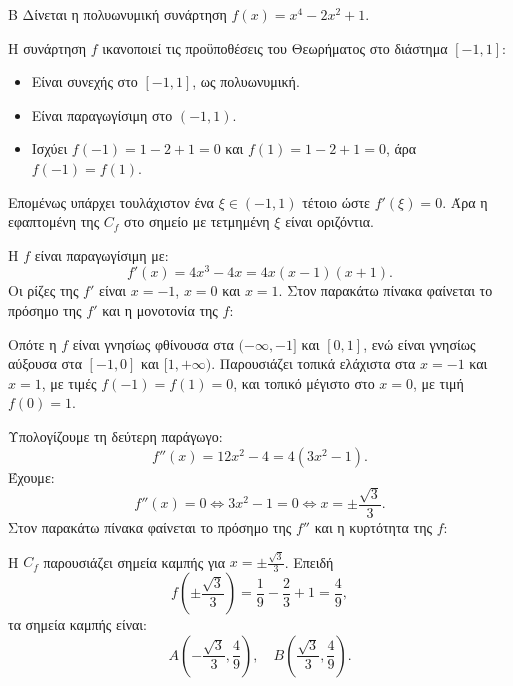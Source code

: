 \begin{thema}{Β}
Δίνεται η πολυωνυμική συνάρτηση $f(x) = x^4 - 2x^2 + 1$.
\begin{erwthma}
\item Η συνάρτηση $f$ ικανοποιεί τις προϋποθέσεις του Θεωρήματος  στο διάστημα $[-1,1]$:
\begin{itemize}
\item Είναι συνεχής στο $[-1,1]$, ως πολυωνυμική.
\item Είναι παραγωγίσιμη στο $(-1,1)$.
\item Ισχύει $f(-1)=1-2+1=0$ και $f(1)=1-2+1=0$, άρα $f(-1)=f(1)$.
\end{itemize}
Επομένως υπάρχει τουλάχιστον ένα $\xi\in(-1,1)$ τέτοιο ώστε $f'(\xi)=0$. Άρα η εφαπτομένη της $C_f$ στο σημείο με τετμημένη $\xi$ είναι οριζόντια.

\item Η $f$ είναι παραγωγίσιμη με:
\[ f'(x)=4x^3-4x=4x(x-1)(x+1). \]
Οι ρίζες της $f'$ είναι $x=-1$, $x=0$ και $x=1$.
Στον παρακάτω πίνακα φαίνεται το πρόσημο της $f'$ και η μονοτονία της $f$:
\begin{center}
\end{center}
Οπότε η $f$ είναι γνησίως φθίνουσα στα $(-\infty,-1]$ και $[0,1]$, ενώ είναι γνησίως αύξουσα στα $[-1,0]$ και $[1,+\infty)$.
Παρουσιάζει τοπικά ελάχιστα στα $x=-1$ και $x=1$, με τιμές $f(-1)=f(1)=0$, και τοπικό μέγιστο στο $x=0$, με τιμή $f(0)=1$.

\item Υπολογίζουμε τη δεύτερη παράγωγο:
\[ f''(x)=12x^2-4=4(3x^2-1). \]
Έχουμε:
\[ f''(x)=0 \Leftrightarrow 3x^2-1=0 \Leftrightarrow x=\pm\frac{\sqrt{3}}{3}. \]
Στον παρακάτω πίνακα φαίνεται το πρόσημο της $f''$ και η κυρτότητα της $f$:
\begin{center}
\end{center}
Η $C_f$ παρουσιάζει σημεία καμπής για $x=\pm\frac{\sqrt{3}}{3}$.
Επειδή
\[ f\left(\pm\frac{\sqrt{3}}{3}\right)=\frac{1}{9}-\frac{2}{3}+1=\frac{4}{9}, \]
τα σημεία καμπής είναι:
\[ A\left(-\frac{\sqrt{3}}{3},\frac{4}{9}\right), \quad B\left(\frac{\sqrt{3}}{3},\frac{4}{9}\right). \]


\end{erwthma}
\end{thema}
